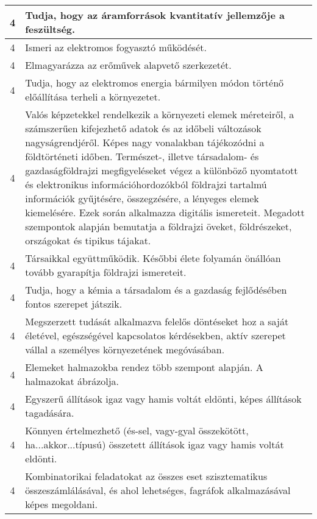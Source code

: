 \begin{longtable}{c | p{12cm} }
                                          4 &  Tudja, hogy az áramforrások kvantitatív jellemzője a feszültség. \\ \hline
                                          4 &  Ismeri az elektromos fogyasztó működését. \\ \hline
                                          4 &  Elmagyarázza az erőművek alapvető szerkezetét. \\ \hline
                                          4 &  Tudja, hogy az elektromos energia bármilyen módon történő előállítása terheli a környezetet. \\ \hline
                                          4 &  Valós képzetekkel rendelkezik a környezeti elemek méreteiről, a számszerűen kifejezhető adatok és az időbeli változások nagyságrendjéről. Képes nagy vonalakban tájékozódni a földtörténeti időben. Természet-, illetve társadalom- és gazdaságföldrajzi megfigyeléseket végez a különböző nyomtatott és elektronikus információhordozókból földrajzi tartalmú információk gyűjtésére, összegzésére, a lényeges elemek kiemelésére. Ezek során alkalmazza digitális ismereteit. Megadott szempontok alapján bemutatja a földrajzi öveket, földrészeket, országokat és tipikus tájakat. \\ \hline
                                          4 &  Társaikkal együttműködik. Későbbi élete folyamán önállóan tovább gyarapítja földrajzi ismereteit. \\ \hline
                                          4 &  Tudja, hogy a kémia a társadalom és a gazdaság fejlődésében fontos szerepet játszik. \\ \hline
                                          4 &  Megszerzett tudását alkalmazva felelős döntéseket hoz a saját életével, egészségével kapcsolatos kérdésekben, aktív szerepet vállal a személyes környezetének megóvásában. \\ \hline
                                          4 &  Elemeket halmazokba rendez több szempont alapján. A halmazokat ábrázolja. \\ \hline
                                          4 &  Egyszerű állítások igaz vagy hamis voltát eldönti, képes állítások tagadására. \\ \hline
                                          4 &  Könnyen értelmezhető (és-sel, vagy-gyal összekötött, ha...akkor...típusú) összetett állítások igaz vagy hamis voltát eldönti. \\ \hline
                                          4 &  Kombinatorikai feladatokat az összes eset szisztematikus összeszámlálásával, és ahol lehetséges, fagráfok alkalmazásával képes megoldani. \\ \hline

\end{longtable}
